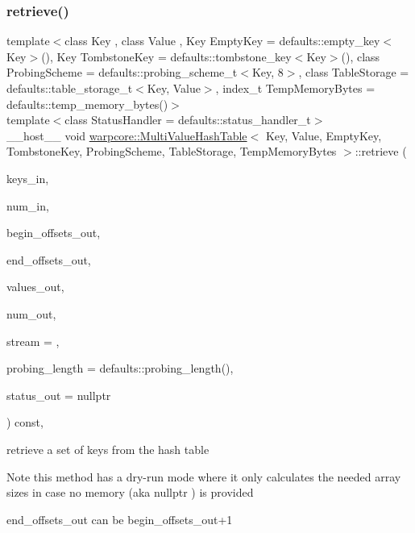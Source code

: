 \subsubsection{\texorpdfstring{retrieve()}{retrieve()}\hspace{0.1cm}{\footnotesize\ttfamily [2/2]}}
{\footnotesize\ttfamily template$<$class Key , class Value , Key Empty\+Key = defaults\+::empty\+\_\+key$<$\+Key$>$(), Key Tombstone\+Key = defaults\+::tombstone\+\_\+key$<$\+Key$>$(), class Probing\+Scheme  = defaults\+::probing\+\_\+scheme\+\_\+t$<$\+Key, 8$>$, class Table\+Storage  = defaults\+::table\+\_\+storage\+\_\+t$<$\+Key, Value$>$, index\+\_\+t Temp\+Memory\+Bytes = defaults\+::temp\+\_\+memory\+\_\+bytes()$>$ \\
template$<$class Status\+Handler  = defaults\+::status\+\_\+handler\+\_\+t$>$ \\
\+\_\+\+\_\+host\+\_\+\+\_\+ void \hyperlink{classwarpcore_1_1MultiValueHashTable}{warpcore\+::\+Multi\+Value\+Hash\+Table}$<$ Key, Value, Empty\+Key, Tombstone\+Key, Probing\+Scheme, Table\+Storage, Temp\+Memory\+Bytes $>$\+::retrieve (\begin{DoxyParamCaption}\item[{const key\+\_\+type $\ast$const}]{keys\+\_\+in,  }\item[{const index\+\_\+type}]{num\+\_\+in,  }\item[{index\+\_\+type $\ast$const}]{begin\+\_\+offsets\+\_\+out,  }\item[{index\+\_\+type $\ast$const}]{end\+\_\+offsets\+\_\+out,  }\item[{value\+\_\+type $\ast$const}]{values\+\_\+out,  }\item[{index\+\_\+type \&}]{num\+\_\+out,  }\item[{const cuda\+Stream\+\_\+t}]{stream = {},  }\item[{const index\+\_\+type}]{probing\+\_\+length = {\ttfamily defaults\+:\+:probing\+\_\+length()},  }\item[{typename Status\+Handler\+::base\+\_\+type $\ast$const}]{status\+\_\+out = {\ttfamily nullptr} }\end{DoxyParamCaption}) const\hspace{0.3cm}{\ttfamily [inline]}, {\ttfamily [noexcept]}}



retrieve a set of keys from the hash table 

\begin{DoxyNote}{Note}
this method has a dry-\/run mode where it only calculates the needed array sizes in case no memory (aka {\ttfamily nullptr} ) is provided 

{\ttfamily end\+\_\+offsets\+\_\+out} can be {\ttfamily begin\+\_\+offsets\+\_\+out+1} 
\end{DoxyNote}

